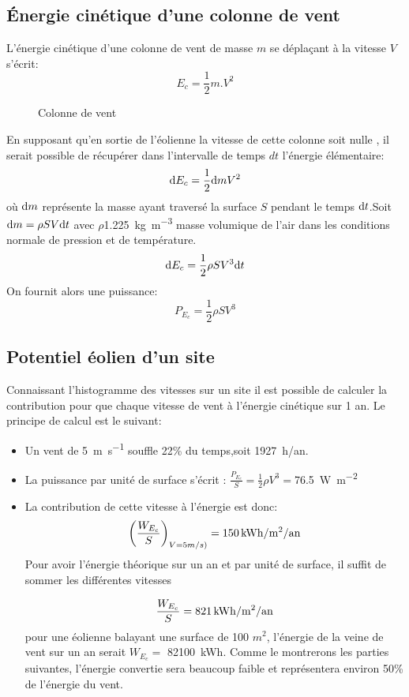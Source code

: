 \documentclass[main.tex]{subfiles}
\begin{document}
\subsection{Énergie cinétique d'une colonne de vent}
L'énergie cinétique d'une colonne de vent de masse $m$ se déplaçant à la vitesse $V$ s'écrit:
\[
E_c = \frac{1}{2}m.V^2
\]
\begin{figure}[H]
  \centering
  \caption{Colonne de vent}
\end{figure}
En supposant qu'en sortie de l'éolienne la vitesse de cette colonne soit nulle , il serait possible de récupérer dans l'intervalle de temps $dt$ l'énergie élémentaire:
\[
  \mbox{d} E_c= \frac{1}{2}\mbox{d} mV^2
\]
où $\mbox{d} m$ représente la masse ayant traversé la surface $S$ pendant le temps $\mbox{d} t$.Soit $\mbox{d} m = \rho SV\mbox{d} t$ avec $\rho$\SI{1,225}{\kg\per\m^3} masse volumique de l'air dans les conditions normale de pression et de température.
\[
  \mbox{d} E_c= \frac{1}{2}\rho SV^3 \mbox{d} t
\]
On fournit alors une puissance:
\[
  P_{E_c} = \frac{1}{2}\rho SV^3
\]
\subsection{Potentiel éolien d'un site}
Connaissant l'histogramme des vitesses sur un site il est possible de calculer la contribution pour que chaque vitesse de vent à l'énergie cinétique sur 1 an. Le principe de calcul est le suivant:
\begin{itemize}
\item Un vent de \SI{5}{\m\per\s} souffle 22\% du temps,soit \SI{1927}{h/an}.
\item La puissance par unité de surface s'écrit : $\frac{P_{E_c}}{S} = \frac{1}{2}\rho V^3 = $\SI{76,5}{W\per\m^2}
\item La contribution de cette vitesse à l'énergie est donc:
\[
  \left(\frac{W_{E_c}}{S}\right)_{V=5m/s)} = \text{\SI{150}{kWh/m^2/an}}
\]
Pour avoir l'énergie théorique sur un an et par unité de surface, il suffit de sommer les différentes vitesses

\[
  \frac{W_{E_c}}{S} = \text{\SI{821}{kWh/m^2/an}}
\]
pour une éolienne balayant une surface de 100 $m^2$, l'énergie de la veine de vent sur un an serait $W_{E_c} =$ \SI{82100}{kWh}.
Comme le montrerons les parties suivantes, l'énergie convertie sera beaucoup faible et représentera environ 50\% de l'énergie du vent.
\end{itemize}
\end{document}
